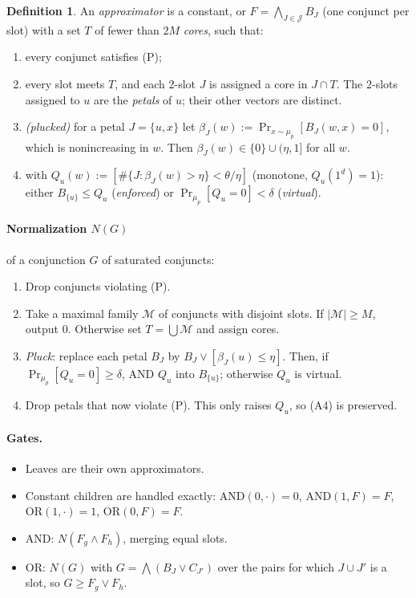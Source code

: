 \documentclass[11pt,a4paper]{article}
\theoremstyle{plain}
\theoremstyle{definition}
\newtheorem{definition}[theorem]{Definition}
\theoremstyle{remark}
\newcommand{\ones}{1^d}
\begin{document}
\begin{definition}\label{def:approx}
An \emph{approximator} is a constant, or $F=\bigwedge_{J\in\mathcal J}B_J$ (one conjunct per slot) with a set $T$ of
fewer than $2M$ \emph{cores}, such that:
\begin{enumerate}[label=(A\arabic*)]
  \item every conjunct satisfies (P);
  \item every slot meets $T$, and each 2-slot $J$ is assigned a core in $J\cap T$. The 2-slots assigned to $u$ are
    the \emph{petals} of $u$; their other vectors are distinct.
  \item \emph{(plucked)} for a petal $J=\{u,x\}$ let $\beta_J(w):=\Pr_{x\sim\mu_p}[B_J(w,x)=0]$, which is
    nonincreasing in $w$. Then $\beta_J(w)\in\{0\}\cup(\eta,1]$ for all $w$.
  \item with $Q_u(w):=[\#\{J:\beta_J(w)>\eta\}<\theta/\eta]$ (monotone, $Q_u(\ones)=1$): either $B_{\{u\}}\le Q_u$
    (\emph{enforced}) or $\Pr_{\mu_p}[Q_u=0]<\delta$ (\emph{virtual}).
\end{enumerate}
\end{definition}

\paragraph{Normalization $N(G)$} of a conjunction $G$ of saturated conjuncts:
\begin{enumerate}
  \item Drop conjuncts violating (P).
  \item Take a maximal family $\mathcal M$ of conjuncts with disjoint slots. If $|\mathcal M|\ge M$, output 0.
    Otherwise set $T=\bigcup\mathcal M$ and assign cores.
  \item \emph{Pluck}: replace each petal $B_J$ by $B_J\vee[\beta_J(u)\le\eta]$. Then, if
    $\Pr_{\mu_p}[Q_u=0]\ge\delta$, AND $Q_u$ into $B_{\{u\}}$; otherwise $Q_u$ is virtual.
  \item Drop petals that now violate (P). This only raises $Q_u$, so (A4) is preserved.
\end{enumerate}

\paragraph{Gates.}
\begin{itemize}
  \item Leaves are their own approximators.
  \item Constant children are handled exactly: $\mathrm{AND}(0,\cdot)=0$, $\mathrm{AND}(1,F)=F$,
    $\mathrm{OR}(1,\cdot)=1$, $\mathrm{OR}(0,F)=F$.
  \item AND: $N(F_g\wedge F_h)$, merging equal slots.
  \item OR: $N(G)$ with $G=\bigwedge(B_J\vee C_{J'})$ over the pairs for which $J\cup J'$ is a slot, so
    $G\ge F_g\vee F_h$.
\end{itemize}
\end{document}
